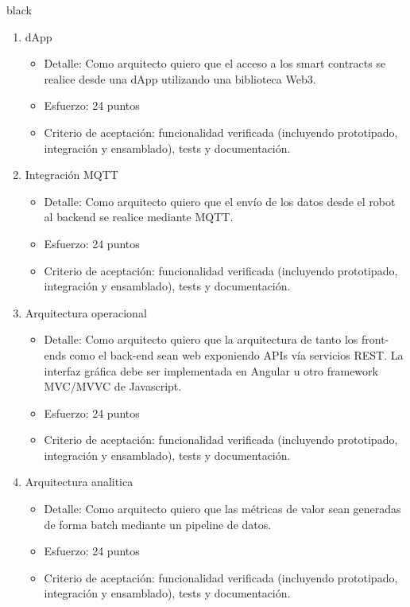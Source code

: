 \documentclass[
11pt, %
]{charter}
\begin{document}
\begin{consigna}{black}
\begin{enumerate}
	\item dApp
	\begin{itemize}
		\item Detalle: Como arquitecto quiero que el acceso a los smart contracts se realice desde una dApp utilizando una biblioteca Web3.
		\item Esfuerzo: 24 puntos
		\item Criterio de aceptación: funcionalidad verificada (incluyendo prototipado, integración y ensamblado), tests y documentación.
	\end{itemize}
	
	\item Integración MQTT
	\begin{itemize}
		\item Detalle: Como arquitecto quiero que el envío de los datos desde el robot al backend se realice mediante MQTT.
		\item Esfuerzo: 24 puntos
		\item Criterio de aceptación: funcionalidad verificada (incluyendo prototipado, integración y ensamblado), tests y documentación.
	\end{itemize}


	\item Arquitectura operacional
	\begin{itemize}
		\item Detalle: Como arquitecto quiero que la arquitectura de tanto los front-ends como el back-end sean web exponiendo APIs vía servicios REST. La interfaz gráfica debe ser implementada en Angular u otro framework MVC/MVVC de Javascript.
		\item Esfuerzo: 24 puntos
		\item Criterio de aceptación: funcionalidad verificada (incluyendo prototipado, integración y ensamblado), tests y documentación.
	\end{itemize}

	\item Arquitectura analitica
	\begin{itemize}
		\item Detalle: Como arquitecto quiero que las métricas de valor sean generadas de forma batch mediante un pipeline de datos.
		\item Esfuerzo: 24 puntos
		\item Criterio de aceptación: funcionalidad verificada (incluyendo prototipado, integración y ensamblado), tests y documentación.
	\end{itemize}


\end{enumerate}
\end{consigna}
\end{document}
